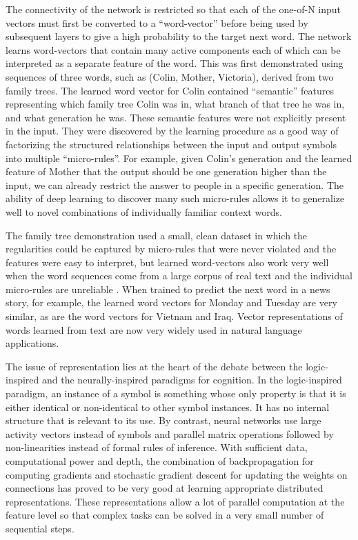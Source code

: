 \documentclass[]{article}
\begin{document}
The connectivity of the network is restricted so that each of the one-of-N input vectors must first be converted to a
``word-vector'' before being used by subsequent layers to give a high probability to the target next word.  The network
learns word-vectors that contain many active components each of which can be interpreted as a separate feature of the
word. This was first demonstrated\cite{RHW} using sequences of three words, such as (Colin, Mother, Victoria), derived
from two family trees. The learned word vector for Colin contained ``semantic'' features representing which family tree
Colin was in, what branch of that tree he was in, and what generation he was\cite{hinton86}. These semantic features
were not explicitly present in the input.  They were discovered by the learning procedure as a good way of factorizing
the structured relationships between the input and output symbols into multiple ``micro-rules''.  For example, given
Colin's generation and the learned feature of Mother that the output should be one generation higher than the input, we
can already restrict the answer to people in a specific generation. The ability of deep learning to discover many such
micro-rules allows it to generalize well to novel combinations of individually familiar context words.

The family tree demonstration used a small, clean dataset in which the regularities could be captured by micro-rules
that were never violated and the features were easy to interpret, but learned word-vectors also work very well when the word
sequences come from a large corpus of real text and the individual micro-rules are unreliable\cite{NPLM} . When trained
to predict the next word in a news story, for example, the learned word vectors for Monday and Tuesday are very similar,
as are the word vectors for Vietnam and Iraq.  Vector representations of words learned from text are now very widely
used in natural language applications\cite{Collobert, Mikolov, Socher?}.

The issue of representation lies at the heart of the debate between the logic-inspired and the neurally-inspired
paradigms for cognition. In the logic-inspired paradigm, an instance of a symbol is something whose only property is
that it is either identical or non-identical to other symbol instances. It has no internal structure that is
relevant to its use. By contrast, neural networks use large activity vectors instead of symbols and parallel matrix
operations followed by non-linearities instead of formal rules of inference. With sufficient data, computational power
and depth, the combination of backpropagation for computing gradients and stochastic gradient descent for updating the
weights on connections has proved to be very good at learning appropriate distributed representations. These
representations allow a lot of parallel computation at the feature level so that complex tasks can be solved in a very
small number of sequential steps.
\end{document}
